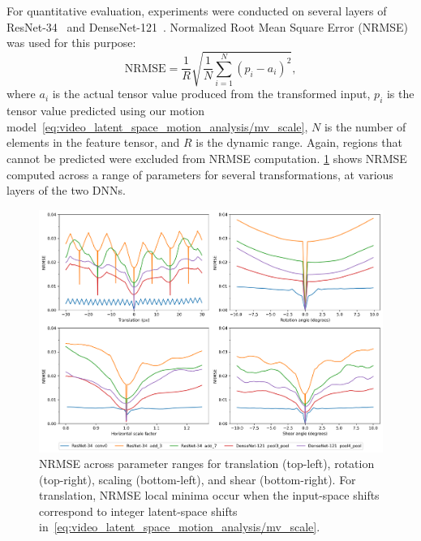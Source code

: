 


For quantitative evaluation, experiments were conducted on several layers of ResNet-34~\cite{ResNet} and DenseNet-121~\cite{DenseNet}. Normalized Root Mean Square Error (NRMSE)~\cite{wiki:NRMSE} was used for this purpose:
\begin{equation}
    \text{NRMSE} =  \frac{1}{R} \sqrt{\frac{1}{N} \sum_{i=1}^N (p_i - a_i)^2},
    \label{eq:video_latent_space_motion_analysis/NRMSE}
\end{equation}
where $a_i$ is the actual tensor value produced %
from the transformed input, $p_i$
is the tensor value predicted using our motion model~\cref{eq:video_latent_space_motion_analysis/mv_scale}, $N$ is the number of elements in the feature tensor, and $R$ is the dynamic range. Again, regions that cannot be predicted were excluded from NRMSE computation. \cref{fig:video_latent_space_motion_analysis/transform} shows NRMSE computed across a range of parameters for several transformations, at various layers of the two DNNs. %


\begin{figure}[tb]
    \centering
    \includegraphics[width=\linewidth]{img/video_latent_space_motion_analysis/nrmse/transform_curves-all.png}
    \caption[NRMSE for various transformations]{%
        NRMSE across parameter ranges for translation (top-left), rotation (top-right), scaling (bottom-left), and shear (bottom-right).
        For translation, NRMSE local minima occur when the input-space shifts correspond to integer latent-space shifts in~\cref{eq:video_latent_space_motion_analysis/mv_scale}.%
    }
    \label{fig:video_latent_space_motion_analysis/transform}
\end{figure}



